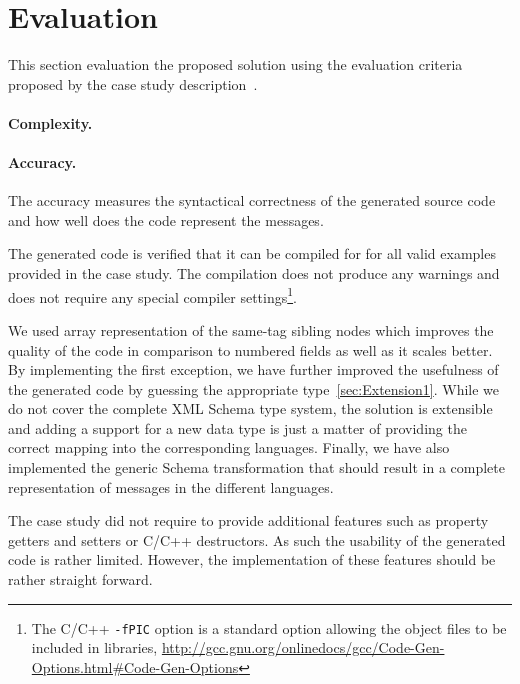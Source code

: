 
\section{Evaluation}
\label{sec:Evaluation}

This section evaluation the proposed solution using the evaluation criteria proposed by the case study description~\cite{Lano2014}.

\paragraph{Complexity.}


\paragraph{Accuracy.}
%
The accuracy measures the syntactical correctness of the generated source code and how well does the code represent the \FIXML messages.

The generated code is verified that it can be compiled for for all valid examples provided in the case study.
The compilation does not produce any warnings and does not require any special compiler settings\footnote{The C/C++ \texttt{-fPIC} option is a standard option allowing the object files to be included in libraries, \Cf \url{http://gcc.gnu.org/onlinedocs/gcc/Code-Gen-Options.html\#Code-Gen-Options}}.

We used array representation of the same-tag sibling nodes which improves the quality of the code in comparison to numbered fields as well as it scales better.
By implementing the first exception, we have further improved the usefulness of the generated code by guessing the appropriate type~\ref{sec:Extension1}.
While we do not cover the complete XML Schema type system, the solution is extensible and adding a support for a new data type is just a matter of providing the correct mapping into the corresponding languages.
Finally, we have also implemented the generic \FIXML Schema transformation that should result in a complete representation of \FIXML messages in the different languages.

The case study did not require to provide additional features such as property getters and setters or C/C++ destructors.
As such the usability of the generated code is rather limited.
However, the implementation of these features should be rather straight forward.

